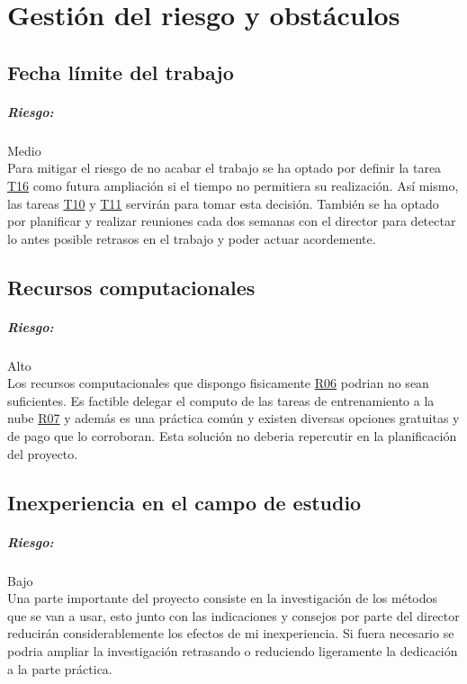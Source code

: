 
\chapter{Gestión del riesgo y obstáculos}\label{riskmanagement}
\section{Fecha límite del trabajo}
\paragraph{Riesgo:} Medio\\
Para mitigar el riesgo de no acabar el trabajo se ha optado por definir la tarea \hyperref[T16]{T16} 
como futura ampliación si el tiempo no permitiera su realización. Así mismo, las tareas \hyperref[T10]{T10} y
\hyperref[T11]{T11} servirán para tomar esta decisión.
También se ha optado por planificar y realizar reuniones cada dos semanas con el director
para detectar lo antes posible retrasos en el trabajo y poder actuar acordemente.

\section{Recursos computacionales}
\paragraph{Riesgo:} Alto\\
Los recursos computacionales que dispongo fisicamente \hyperref[R06]{R06} podrian no sean suficientes.
Es factible delegar el computo de las tareas de entrenamiento a la nube \hyperref[R07]{R07} y además
es una práctica común y existen diversas opciones gratuitas y de pago que lo corroboran.
Esta solución no deberia repercutir en la planificación del proyecto.

\section{Inexperiencia en el campo de estudio}
\paragraph{Riesgo:} Bajo\\
Una parte importante del proyecto consiste en la investigación de los métodos que se van a usar, esto
junto con las indicaciones y consejos por parte del director reducirán considerablemente los efectos
de mi inexperiencia.
Si fuera necesario se podria ampliar la investigación retrasando o reduciendo ligeramente la
dedicación a la parte práctica.

